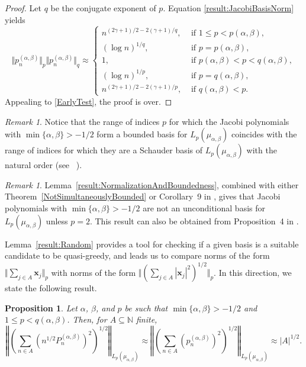 \documentclass[11pt, leqno]{amsart}
\newtheorem{proposition}[theorem]{Proposition}
\theoremstyle{remark}
\newtheorem{remark}[theorem]{Remark}
\numberwithin{equation}{section}
\newcommand{\NN}{\ensuremath{\mathbb{N}}}
\newcommand{\xx}{\ensuremath{\mathbf{x}}}
\begin{document}
\begin{proof} 
Let $q$ be the conjugate exponent of $p$. Equation \eqref{result:JacobiBasisNorm} yields
\begin{equation*}
\Vert p_n^{(\alpha,\beta)} \Vert_p
\Vert p_n^{(\alpha,\beta)} \Vert_q
\approx
 \begin{cases}
  n^{(2 \gamma+1)/2-2( \gamma+1)/q}, & \text{ if } 1\le p < p(\alpha,\beta),\\
   (\log n)^{1/q}, & \text{ if } p=p(\alpha,\beta),\\
  1, & \text{ if }  p(\alpha,\beta) <p<q(\alpha,\beta), \\
 (\log n)^{1/p}, & \text{ if } p=q(\alpha,\beta),\\
 n^{(2 \gamma+1)/2-2( \gamma+1)/p}, & \text{ if } q(\alpha,\beta)<p.
\end{cases}
\end{equation*}
Appealing to \eqref{EarlyTest}, the proof is over.
\end{proof}

\begin{remark}
Notice that the range of indices $p$ for which the Jacobi polynomials with $\min\{\alpha,\beta\}>-1/2$ form a bounded basis for $L_p(\mu_{\alpha,\beta})$ coincides with the range of indices for which they are a Schauder basis of $L_p(\mu_{\alpha,\beta})$ with the natural order (see ~\cite{Pollard}).
\end{remark}


\begin{remark}
Lemma~\ref{result:NormalizationAndBoundedness}, combined with either Theorem~\ref{NotSimultaneouslyBounded} or Corollary~9 in \cite{KadPel1962}, gives that Jacobi polynomials with $\min\{\alpha,\beta\}>-1/2$ are not an unconditional basis for $L_p(\mu_{\alpha,\beta})$ unless $p=2$.
This result can also be obtained from Proposition~4 in \cite{KonigNielsen1994}.
\end{remark}

Lemma~\ref{result:Random} provides a tool for checking if a given basis is a suitable candidate to be quasi-greedy, and leads us to compare norms of the form
$\Vert \sum_{j\in A} \xx_j \Vert_p$ with norms of the form $\Vert (\sum_{j\in A} |\xx_j|^2)^{1/2} \Vert_p$. 
In this direction, we state the following result.

\begin{proposition}
\label{result:AverageJacobiNorm} 
Let  $\alpha$, $\beta$, and $p$ be such that $\min\{\alpha, \beta\}>-1/2$ and
  $1\le p<q(\alpha,\beta)$.
Then, for $A\subseteq \NN$ finite,
\[
\left\Vert\left(\sum_{n\in A} \left(n^{1/2} P_n^{(\alpha,\beta)}\right)^2\right)^{1/2}\right\Vert_{L_p(\mu_{\alpha,\beta})} \approx 
\left\Vert\left(\sum_{n\in A} \left(p_n^{(\alpha,\beta)}\right)^2\right)^{1/2}\right\Vert_{L_p(\mu_{\alpha,\beta})} \approx |A|^{1/2}.
\]
\end{proposition}
\end{document}
